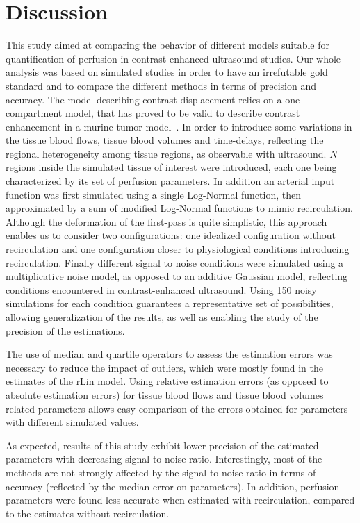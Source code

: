 \section{Discussion}
This study aimed at comparing the behavior of different models suitable for quantification of perfusion in contrast-enhanced ultrasound studies. Our whole analysis was based on simulated studies in order to have an irrefutable gold standard and to compare the different methods in terms of precision and accuracy. The model describing contrast displacement relies on a one-compartment model, that has proved to be valid to describe contrast enhancement in a murine tumor model~\cite{Doury:2017fz}. In order to introduce some variations in the tissue blood flows, tissue blood volumes and time-delays, reflecting the regional heterogeneity among tissue regions, as observable with ultrasound. $N$ regions inside the simulated tissue of interest were introduced, each one being characterized by its set of perfusion parameters. In addition an arterial input function was first simulated using a single Log-Normal function, then approximated by a sum of modified Log-Normal functions to mimic recirculation. Although the deformation of the first-pass is quite simplistic, this approach enables us to consider two configurations: one idealized configuration without recirculation and one configuration closer to physiological conditions introducing recirculation. Finally different signal to noise conditions were simulated using a multiplicative noise model, as opposed to an additive Gaussian model, reflecting conditions encountered in contrast-enhanced ultrasound. Using 150 noisy simulations for each condition guarantees a representative set of possibilities, allowing generalization of the results, as well as enabling the study of the precision of the estimations.

The use of median and quartile operators to assess the estimation errors was necessary to reduce the impact of outliers, which were mostly found in the estimates of the rLin model. Using relative estimation errors (as opposed to absolute estimation errors) for tissue blood flows and tissue blood volumes related parameters allows easy comparison of the errors obtained for parameters with different simulated values. 

As expected, results of this study exhibit lower precision of the estimated parameters with decreasing signal to noise ratio. Interestingly, most of the methods are not strongly affected by the signal to noise ratio in terms of accuracy (reflected by the median error on parameters). In addition, perfusion parameters were found less accurate when estimated with recirculation, compared to the estimates without recirculation. 

